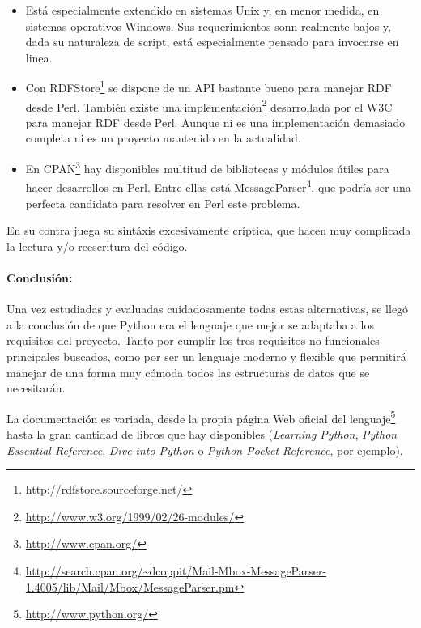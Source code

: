 \begin{itemize}
  \item Está especialmente extendido en sistemas Unix y, en menor medida, en sistemas
	operativos Windows. Sus requerimientos sonn realmente bajos y, dada su naturaleza
	de script, está especialmente pensado para invocarse en linea.
  \item Con RDFStore\footnote{http://rdfstore.sourceforge.net/} se dispone de un API bastante
	bueno para manejar RDF desde Perl. También existe una
	implementación\footnote{\url{http://www.w3.org/1999/02/26-modules/}} 
	desarrollada por el W3C para manejar RDF desde Perl. Aunque ni es una implementación
	demasiado completa ni es un proyecto mantenido en la actualidad.
  \item En CPAN\footnote{\url{http://www.cpan.org/}} hay disponibles multitud de bibliotecas
	y módulos útiles para hacer desarrollos en Perl. Entre ellas está
	MessageParser\footnote{\url{http://search.cpan.org/~dcoppit/Mail-Mbox-MessageParser-1.4005/lib/Mail/Mbox/MessageParser.pm}},
	que podría ser una perfecta candidata para resolver en Perl este problema.
\end{itemize}

En su contra juega su sintáxis excesivamente críptica, que hacen muy complicada
la lectura y/o reescritura del código.

\newpage

\paragraph{Conclusión:} Una vez estudiadas y evaluadas cuidadosamente todas estas 
alternativas, se llegó a la conclusión de que Python era el lenguaje que mejor se 
adaptaba a los requisitos del proyecto. Tanto por cumplir los tres requisitos 
no funcionales principales buscados, como por ser un lenguaje moderno y flexible 
que permitirá manejar de una forma muy cómoda todos las estructuras de datos que se
necesitarán.

La documentación es variada, desde la propia página Web oficial del 
lenguaje\footnote{\url{http://www.python.org/}} hasta la gran cantidad de libros
que hay disponibles (\emph{Learning Python}\cite{LearningPython},
\emph{Python Essential Reference}\cite{PythonEssential}, 
\emph{Dive into Python}\cite{DivePython} o \emph{Python Pocket Reference}\cite{PythonPocket},
por ejemplo).
